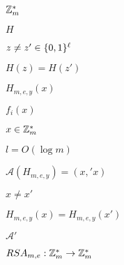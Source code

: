 \documentclass[10pt]{book}
\begin{document}
\begin{mdSnippets}
\begin{mdInlineSnippet}[9fc929ca8e961b6fb602959db12ff119]
$\mathbb{Z}^*_m$\end{mdInlineSnippet}%
\begin{mdInlineSnippet}[c1d9f50f86825a1a2302ec2449c17196]%
$H$\end{mdInlineSnippet}%
\begin{mdInlineSnippet}[79fb87fbc03b26076186ec428e678fc1]%
$z\neq z' \in \{0,1\}^\ell$\end{mdInlineSnippet}%
\begin{mdInlineSnippet}[db97c5310dca6b4d7365e4d3644cb951]%
$H(z)=H(z')$\end{mdInlineSnippet}%
\begin{mdInlineSnippet}[000f7de62790f624c338709626f646c2]%
$H_{m,e,y}(x)$\end{mdInlineSnippet}%
\begin{mdInlineSnippet}[a230e1b872d6720d1cc617862626ffde]%
$f_i(x)$\end{mdInlineSnippet}%
\begin{mdInlineSnippet}[c2e55fcf46fa0373fb2422d658e90705]%
$x \in \mathbb{Z}_m^*$\end{mdInlineSnippet}%
\begin{mdInlineSnippet}[1b161090432849ad5e5e6891de536cad]%
$l = O(\log m)$\end{mdInlineSnippet}%
\begin{mdInlineSnippet}[7437b5765b5a62528ef8baadd7c0a17d]%
$\mathcal{A}(H_{m,e,y}) = (x,'x)$\end{mdInlineSnippet}%
\begin{mdInlineSnippet}%
$x \neq x'$\end{mdInlineSnippet}%
\begin{mdInlineSnippet}[73ef3d3ba7118197b7a9f968907fb5c1]%
$H_{m,e,y}(x) = H_{m,e,y}(x')$\end{mdInlineSnippet}%
\begin{mdInlineSnippet}%
$\mathcal{A'}$\end{mdInlineSnippet}%
\begin{mdInlineSnippet}%
$RSA_{m,e}: \mathbb{Z}_m^* \to \mathbb{Z}_m^*$\end{mdInlineSnippet}%
\begin{mdInlineSnippet}%

\end{mdInlineSnippet}
\end{mdSnippets}
\end{document}
